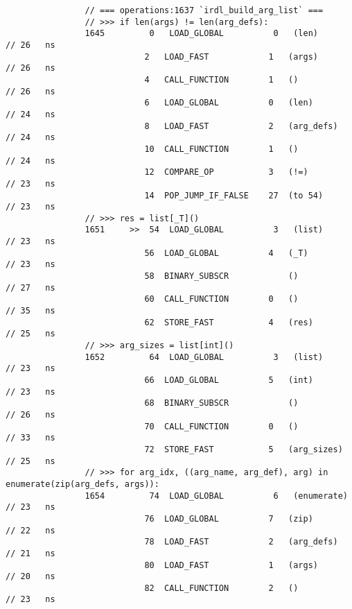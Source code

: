 \begin{code}
\begin{verbatim}
                // === operations:1637 `irdl_build_arg_list` ===
                // >>> if len(args) != len(arg_defs):
                1645         0   LOAD_GLOBAL          0   (len)                             // 26   ns
                            2   LOAD_FAST            1   (args)                             // 26   ns
                            4   CALL_FUNCTION        1   ()                                 // 26   ns
                            6   LOAD_GLOBAL          0   (len)                              // 24   ns
                            8   LOAD_FAST            2   (arg_defs)                         // 24   ns
                            10  CALL_FUNCTION        1   ()                                 // 24   ns
                            12  COMPARE_OP           3   (!=)                               // 23   ns
                            14  POP_JUMP_IF_FALSE    27  (to 54)                            // 23   ns
                // >>> res = list[_T]()
                1651     >>  54  LOAD_GLOBAL          3   (list)                            // 23   ns
                            56  LOAD_GLOBAL          4   (_T)                               // 23   ns
                            58  BINARY_SUBSCR            ()                                 // 27   ns
                            60  CALL_FUNCTION        0   ()                                 // 35   ns
                            62  STORE_FAST           4   (res)                              // 25   ns
                // >>> arg_sizes = list[int]()
                1652         64  LOAD_GLOBAL          3   (list)                            // 23   ns
                            66  LOAD_GLOBAL          5   (int)                              // 23   ns
                            68  BINARY_SUBSCR            ()                                 // 26   ns
                            70  CALL_FUNCTION        0   ()                                 // 33   ns
                            72  STORE_FAST           5   (arg_sizes)                        // 25   ns
                // >>> for arg_idx, ((arg_name, arg_def), arg) in enumerate(zip(arg_defs, args)):
                1654         74  LOAD_GLOBAL          6   (enumerate)                       // 23   ns
                            76  LOAD_GLOBAL          7   (zip)                              // 22   ns
                            78  LOAD_FAST            2   (arg_defs)                         // 21   ns
                            80  LOAD_FAST            1   (args)                             // 20   ns
                            82  CALL_FUNCTION        2   ()                                 // 23   ns

\end{verbatim}
\end{code}
